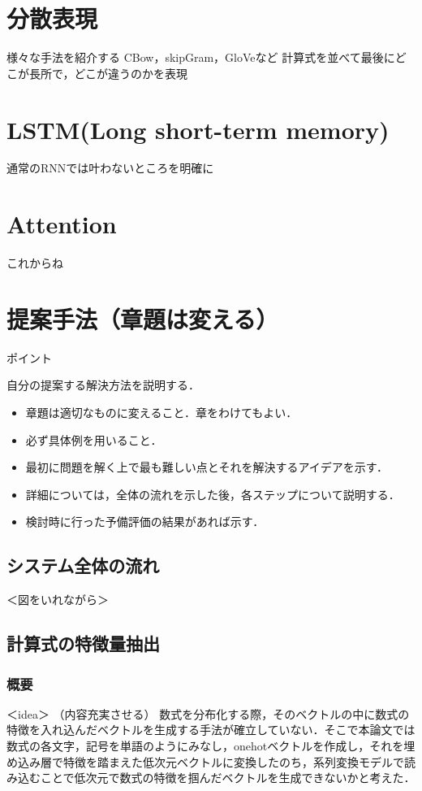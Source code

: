 \documentclass[a4j,11pt,report]{jsbook}
\newcommand{\point}[1]{
\begin{itembox}[l]{ポイント}
  #1
\end{itembox}
}
\begin{document}
\chapter{分散表現\label{ch:Distributed representation}}
様々な手法を紹介する
CBow，skipGram，GloVeなど
計算式を並べて最後にどこが長所で，どこが違うのかを表現




\chapter{LSTM(Long short-term memory)\label{ch:LSTM}}

通常のRNNでは叶わないところを明確に

\chapter{Attention\label{ch:Attention}}

これからね



\chapter{提案手法（章題は変える）\label{ch:method}}
\point{
自分の提案する解決方法を説明する．
\begin{itemize}
  \item 章題は適切なものに変えること．章をわけてもよい．
  \item 必ず具体例を用いること．
  \item 最初に問題を解く上で最も難しい点とそれを解決するアイデアを示す．
  \item 詳細については，全体の流れを示した後，各ステップについて説明する．
  \item 検討時に行った予備評価の結果があれば示す．
\end{itemize}
}

\section{システム全体の流れ}
＜図をいれながら＞



\section{計算式の特徴量抽出}
\subsection{概要}
＜idea＞
（内容充実させる）
数式を分布化する際，そのベクトルの中に数式の特徴を入れ込んだベクトルを生成する手法が確立していない．そこで本論文では数式の各文字，記号を単語のようにみなし，onehotベクトルを作成し，それを埋め込み層で特徴を踏まえた低次元ベクトルに変換したのち，系列変換モデルで読み込むことで低次元で数式の特徴を掴んだベクトルを生成できないかと考えた．
\end{document}
